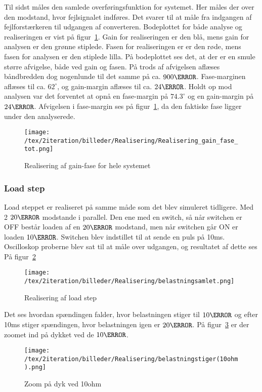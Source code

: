 \noindent Til sidst måles den samlede overføringsfunktion for systemet. Her måles der over den modstand, hvor fejlsignalet indføres. Det svarer til at måle fra indgangen af fejlforstærkeren til udgangen af converteren. Bodeplottet for både analyse og realiseringen er vist på figur~\ref{fig:realisering_gain_fase_tot}. Gain for realiseringen er den blå, mens gain for analysen er den grønne stiplede. Fasen for realiseringen er er den røde, mens fasen for analysen er den stiplede lilla. På bodeplottet ses det, at der er en smule større afvigelse, både ved gain og fasen. På trods af afvigelsen aflæses båndbredden dog nogenlunde til det samme på ca. $900\hertz$. Fase-marginen aflæses til ca. $62^\circ$, og gain-margin aflæses til ca. $24\decibel$. Holdt op mod analysen var det forventet at opnå en fase-margin på $74.3^\circ$ og en gain-margin på $24\decibel$. Afvigelsen i fase-margin ses på figur~\ref{fig:realisering_gain_fase_tot}, da den faktiske fase ligger under den analyserede. 

\begin{figure}[H]
	\center
	\texttt{[image: /tex/2iteration/billeder/Realisering/Realisering\_gain\_fase\_tot.png]}
	\caption{Realisering af gain-fase for hele systemet}
	\label{fig:realisering_gain_fase_tot}
\end{figure}



\subsubsection{Load step} \label{loadsteprea}
\noindent Load steppet er realiseret på samme måde som det blev simuleret tidligere. Med 2 $20\ohm$ modstande i parallel. Den ene med en switch, så når switchen er OFF består loaden af en $20\ohm$ modstand, men når switchen går ON er loaden $10\ohm$. Switchen blev indstillet til at sende en puls på 10ms. Oscilloskop proberne blev sat til at måle over udgangen, og resultatet af dette ses På figur~\ref{fig:belastningsamlet} 

\begin{figure}[H]
	\center
	\texttt{[image: /tex/2iteration/billeder/Realisering/belastningsamlet.png]}
	\caption{Realisering af load step}
	\label{fig:belastningsamlet}
\end{figure}

Det ses hvordan spændingen falder, hvor belastningen stiger til $10\ohm$ og efter 10ms stiger spændingen, hvor belastningen igen er $20\ohm$. På figur~\ref{fig:belastning_10ohm} er der zoomet ind på dykket ved de $10\ohm$. 
\begin{figure}[H]
	\center
	\texttt{[image: /tex/2iteration/billeder/Realisering/belastningstiger(10ohm).png]}
	\caption{Zoom på dyk ved 10ohm}
	\label{fig:belastning_10ohm}
\end{figure}

